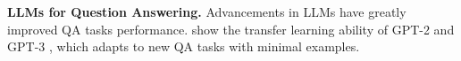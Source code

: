 \noindent
\textbf{LLMs for Question Answering.} 
Advancements in LLMs have greatly improved QA tasks performance. \citet{Radford2019LanguageMA} show the transfer learning ability of GPT-2 and GPT-3 \cite{brown2020language}, which adapts to new QA tasks with minimal examples. %
